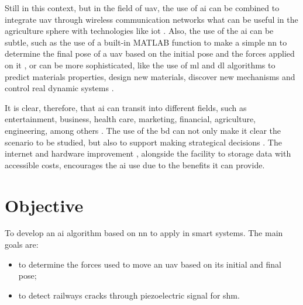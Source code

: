 Still in this context, but in the field of \gls*{uav}, the use of \gls*{ai} can be combined to integrate \gls*{uav} through wireless communication networks \citep{lahmeri2021} what can be useful in the agriculture sphere \citep{ahirwar2019} with technologies like \gls*{iot} \citep{verdouw2016,tzounis2017}.
Also, the use of the \gls*{ai} can be subtle, such as the use of a built-in MATLAB function to make a simple \gls*{nn} to determine the final pose of a \gls*{uav} based on the initial pose and the forces applied on it \citep{geronel2023}, or can be more sophisticated, like the use of \gls*{ml} and \gls*{dl} algorithms to predict materials properties, design new materials, discover new mechanisms and control real dynamic systems \citep{guo2021,assilian1974}.

It is clear, therefore, that \gls*{ai} can transit into different fields, such as entertainment, business, health care, marketing, financial, agriculture, engineering, among others \citep{ruiz-real2020,yu2018,davenport2019,verma2021,mhlanga2020,pannu2015,ghatrehsamani2023}. 
The use of the \gls*{bd} can not only make it clear the scenario to be studied, but also to support making strategical decisions \citep{jeble2018,koscielniak2015}.
The internet and hardware improvement \citep{baji2018}, alongside the facility to storage data with accessible costs, encourages the \gls*{ai} use due to the benefits it can provide.

\section{Objective}

To develop an \gls*{ai} algorithm based on \gls*{nn} to apply in smart systems.
The main goals are:
%
\begin{itemize}
    \item to determine the forces used to move an \gls*{uav} based on its initial and final pose;
    \item to detect railways cracks through piezoelectric signal for \gls*{shm}.
\end{itemize}